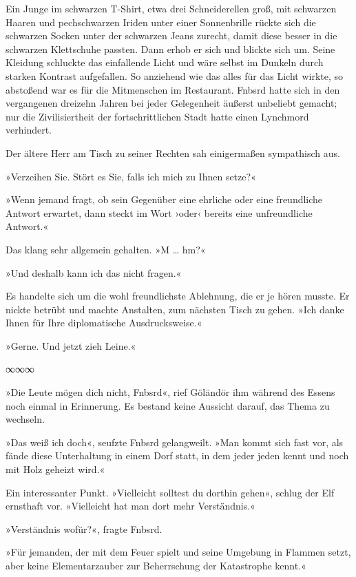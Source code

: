 Ein Junge im schwarzen T-Shirt, etwa drei Schneiderellen groß, mit schwarzen Haaren und pechschwarzen Iriden unter einer Sonnenbrille rückte sich die schwarzen Socken unter der schwarzen Jeans zurecht, damit diese besser in die schwarzen Klettschuhe passten. Dann erhob er sich und blickte sich um. Seine Kleidung schluckte das einfallende Licht und wäre selbst im Dunkeln durch starken Kontrast aufgefallen. So anziehend wie das alles für das Licht wirkte, so abstoßend war es für die Mitmenschen im Restaurant. Fnbsrd hatte sich in den vergangenen dreizehn Jahren bei jeder Gelegenheit äußerst unbeliebt gemacht; nur die Zivilisiertheit der fortschrittlichen Stadt hatte einen Lynchmord verhindert.

Der ältere Herr am Tisch zu seiner Rechten sah einigermaßen sympathisch aus.

»Verzeihen Sie. Stört es Sie, falls ich mich zu Ihnen setze?«

»Wenn jemand fragt, ob sein Gegenüber eine ehrliche oder eine freundliche Antwort erwartet, dann steckt im Wort ›oder‹ bereits eine unfreundliche Antwort.«

Das klang sehr allgemein gehalten. »M … hm?«

»Und deshalb kann ich das nicht fragen.«

Es handelte sich um die wohl freundlichste Ablehnung, die er je hören musste. Er nickte betrübt und machte Anstalten, zum nächsten Tisch zu gehen. »Ich danke Ihnen für Ihre diplomatische Ausdrucksweise.«

»Gerne. Und jetzt zieh Leine.«

\begin{center}
∞∞∞
\end{center}

»Die Leute mögen dich nicht, Fnbsrd«, rief Göländör ihm während des Essens noch einmal in Erinnerung. Es bestand keine Aussicht darauf, das Thema zu wechseln.

»Das weiß ich doch«, seufzte Fnbsrd gelangweilt. »Man kommt sich fast vor, als fände diese Unterhaltung in einem Dorf statt, in dem jeder jeden kennt und noch mit Holz geheizt wird.«

Ein interessanter Punkt. »Vielleicht solltest du dorthin gehen«, schlug der Elf ernsthaft vor. »Vielleicht hat man dort mehr Verständnis.«

»Verständnis wofür?«, fragte Fnbsrd.

»Für jemanden, der mit dem Feuer spielt und seine Umgebung in Flammen setzt, aber keine Elementarzauber zur Beherrschung der Katastrophe kennt.«

